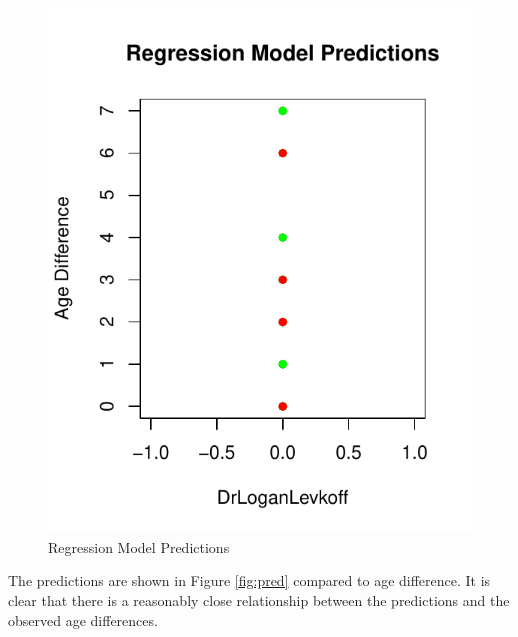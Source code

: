 \documentclass{paper}
\begin{document}
\begin{figure}
\centering
\includegraphics[width=\textwidth]{../Figures/regression.pdf}
\caption{Regression Model Predictions}
\label{fig:reg}
\end{figure}


\pagebreak
The predictions are shown in Figure \ref{fig:pred} compared to age difference.
It is clear that there is a reasonably close relationship between the predictions and the observed age differences.
\end{document}

